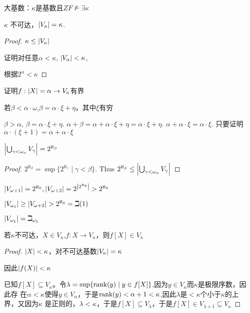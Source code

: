 \documentclass[11pt]{article}
\begin{document}
大基数：\(\kappa\)是基数且\(ZF\not\vDash\exists\kappa\)

\begin{proposition}[]
\(\kappa\) 不可达，\(\abs{V_\kappa}=\kappa\).
\end{proposition}

\begin{proof}
\(\kappa\le\abs{V_\kappa}\)

证明对任意\(\alpha<\kappa\), \(\abs{V_\alpha}<\kappa\),

根据\(2^\alpha<\kappa\)
\end{proof}

证明\(f:\abs{X}=\alpha\to V_\kappa\)有界

若\(\beta<\alpha\cdot\omega\),\(\beta=\alpha\cdot\xi+\eta\)，其中\(\xi\)有穷

\(\beta>\alpha\), \(\beta=\alpha\cdot\xi+\eta\). \(\alpha+\beta=\alpha+\alpha\cdot\xi+\eta=\alpha\cdot\xi+\eta\).  \(\alpha+\alpha\cdot\xi=\alpha\cdot\xi\).
只要证明\(\alpha\cdot(\xi+1)=\alpha+\alpha\cdot\xi\)

\begin{lemma}[]
\(\abs{\bigcup_{\gamma<\omega_\alpha}V_\gamma}=2^{\aleph_\beta}\)
\end{lemma}

\begin{proof}
\(2^{\aleph_\beta}=\sup\{2^{\aleph_\gamma}\mid\gamma<\beta\}\). Thus \(2^{\aleph_\beta}\le\abs{\bigcup_{\gamma<\omega_\alpha}V_\gamma}\)
\end{proof}

\(\abs{V_{\omega+1}}=2^{\aleph_0},\abs{V_{\omega+2}}=2^{\abs{2^{\aleph_0}}}>2^{\aleph_0}\)

\(\abs{V_{\omega_1}}\ge\abs{V_{\omega+2}}>2^{\aleph_0}=\beth(1)\)

\(\abs{V_{\omega_1}}=\beth_{\omega_1}\)

\begin{proposition}[]
若\(\kappa\)不可达，\(X\in V_\kappa\),\(f:X\to V_\kappa\)，则\(f[X]\in V_\kappa\)
\end{proposition}

\begin{proof}
\(\abs{X}<\kappa\)，对不可达基数\(\abs{V_\kappa}=\kappa\)

因此\(\abs{f(X)}<\kappa\)

已知\(f[X]\subseteq V_\kappa\)。令\(\lambda=\sup\{\text{rank}(y)\mid y\in f[X]\}\),因为\(y\in V_\kappa\)而\(\kappa\)是极限序数，因此存
在\(\alpha<\kappa\)使得\(y\in V_\alpha\)，于是\(\text{rank}(y)<\alpha+1<\kappa\),因此\(\lambda\)是\(<\kappa\)个小于\(\kappa\)的上界，又因为\(\kappa\)
是正则的，\(\lambda<\kappa\)，于是\(f[X]\subseteq V_\lambda\)，于是\(f[X]\in V_{\lambda+1}\subseteq V_\kappa\)
\end{proof}
\end{document}
